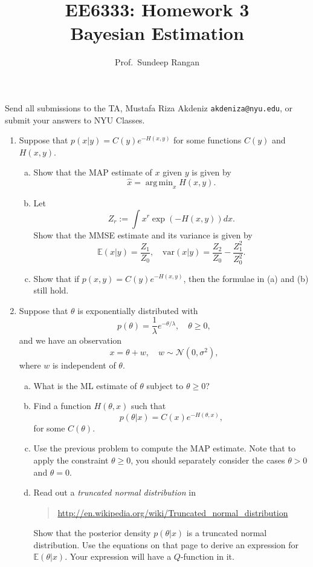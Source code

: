 \documentclass[11pt]{article}
\def\argmin{\mathop{\mathrm{arg\,min}}}
\def\xhat{\widehat{x}}
\def\Exp{\mathbb{E}}
\def\var{\mbox{var}}
\begin{document}
\title{EE6333:  Homework 3\\
Bayesian Estimation}
\author{Prof.\ Sundeep Rangan}
\date{}

\maketitle

Send all submissions to the TA,
Mustafa Riza Akdeniz {\tt akdeniza@nyu.edu}, or submit your answers
to NYU Classes.

\begin{enumerate}


\item \label{prob:pexpH}
Suppose that $p(x|y) = C(y)e^{-H(x,y)}$ 
for some functions $C(y)$ and $H(x,y)$.  
\begin{enumerate}[(a)]
\item Show that the MAP estimate of $x$ given $y$ is given by
\[
    \xhat = \argmin_x H(x,y).
\]
\item Let
\[
    Z_r := \int x^r \exp(-H(x,y))dx.
\]
Show that the MMSE estimate and its variance is given by
\[
    \Exp(x|y) = \frac{Z_1}{Z_0}, \quad \var(x|y) = \frac{Z_2}{Z_0} - \frac{Z_1^2}{Z_0^2}.
\]
\item Show that if $p(x,y) = C(y)e^{-H(x,y)}$, then the formulae
 in (a) and (b) still hold.
\end{enumerate}

\item Suppose that $\theta$ is exponentially distributed with
\[
    p(\theta) = \frac{1}{\lambda}e^{-\theta/\lambda}, 
    \quad \theta \geq 0,
\]
and we have an observation
\[
    x = \theta + w, \quad w \sim {\mathcal N}(0,\sigma^2),
\]
where $w$ is independent of $\theta$.
\begin{enumerate}[(a)]
\item What is the ML estimate of $\theta$ subject to $\theta \geq 0$?


\item Find a function $H(\theta,x)$ such that
\[
    p(\theta|x) = C(x)e^{-H(\theta,x)},
\]
for some $C(\theta)$.

\item Use the previous problem to compute the MAP estimate.
Note that to apply the constraint $\theta \geq 0$, you should
separately consider the cases $\theta > 0$ and $\theta = 0$.

\item Read out a \emph{truncated normal distribution} in
\begin{quote}
    \url{http://en.wikipedia.org/wiki/Truncated_normal_distribution}
\end{quote}
Show that the posterior density $p(\theta|x)$ is a 
truncated normal distribution.  Use the equations
on that page to derive an expression for $\Exp(\theta|x)$.
Your expression will have a $Q$-function in it.



\end{enumerate}
\end{enumerate}
\end{document}
